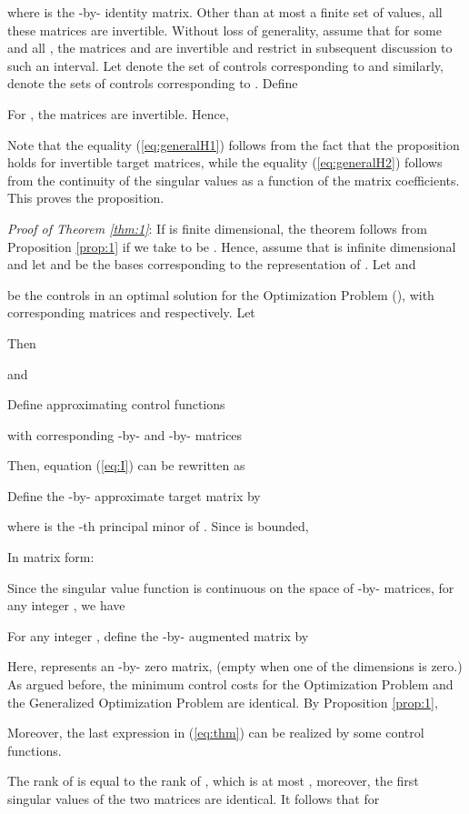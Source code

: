 \documentclass[12pt,onecolumn,draftcls]{IEEEtran}
\begin{document}
where  is the -by- identity matrix.  Other than at most a finite set of values, all
these matrices are invertible.    Without loss of generality, assume that for some  and all ,
the matrices  and  are invertible
and restrict  in subsequent discussion to such an interval.   Let
 denote the set of controls corresponding to 
and similarly,   denote the sets of controls corresponding to .
Define

For , the matrices  are invertible.  Hence,


Note that the equality (\ref{eq:generalH1}) follows from the fact that the proposition holds for invertible target matrices, while
the equality (\ref{eq:generalH2}) follows from the continuity of the singular values as a function of
the matrix coefficients.  This proves the proposition.
\hfill 

\noindent
\textit{Proof of Theorem \ref{thm:1}}: 
\rm If  is finite dimensional, the theorem follows from Proposition
\ref{prop:1} if we take  to be .  Hence, assume that  is infinite dimensional and 
let  and  be the bases corresponding to the representation of .  Let
 and

be the controls in an optimal solution for the Optimization Problem (), with corresponding
matrices  and  respectively.   Let

Then

and


Define approximating control functions

with corresponding -by- and -by- matrices

Then, equation (\ref{eq:I}) can be rewritten as

Define the -by- approximate target matrix by

where  is the -th principal minor of .  Since  is bounded, 

In matrix form:

Since the singular value function is continuous on the space of -by- matrices, for any integer ,
we have


For any integer , define the -by- augmented matrix  by

Here,  represents an -by- zero matrix, (empty when one of the dimensions is zero.)
As argued before, the minimum control costs for the Optimization Problem
 and the Generalized Optimization Problem
 are identical.  By Proposition \ref{prop:1},


Moreover, the last expression in (\ref{eq:thm}) can be realized by some control functions. 

The rank of  is equal to the rank of
, which is at most , moreover, the first 
singular values of the two matrices are identical.   It follows that
for 
\end{document}
